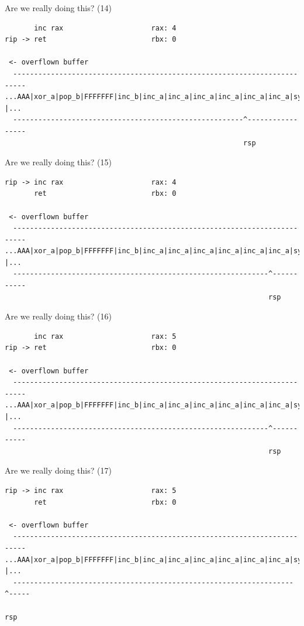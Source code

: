\documentclass[9pt,aspectratio=169]{beamer}
\begin{document}
\begin{frame}[label={sec:org4b069a3},fragile]{Are we really doing this? (14)}
 \begin{verbatim}
       inc rax                     rax: 4
rip -> ret                         rbx: 0

 <- overflown buffer 
  -------------------------------------------------------------------------
...AAA|xor_a|pop_b|FFFFFFF|inc_b|inc_a|inc_a|inc_a|inc_a|inc_a|inc_a|sys |...
  -------------------------------------------------------^-----------------
                                                         rsp
\end{verbatim}
\end{frame}
\begin{frame}[label={sec:org45c3570},fragile]{Are we really doing this? (15)}
 \begin{verbatim}
rip -> inc rax                     rax: 4
       ret                         rbx: 0

 <- overflown buffer 
  -------------------------------------------------------------------------
...AAA|xor_a|pop_b|FFFFFFF|inc_b|inc_a|inc_a|inc_a|inc_a|inc_a|inc_a|sys |...
  -------------------------------------------------------------^-----------
                                                               rsp
\end{verbatim}
\end{frame}
\begin{frame}[label={sec:orgaacbc47},fragile]{Are we really doing this? (16)}
 \begin{verbatim}
       inc rax                     rax: 5
rip -> ret                         rbx: 0

 <- overflown buffer 
  -------------------------------------------------------------------------
...AAA|xor_a|pop_b|FFFFFFF|inc_b|inc_a|inc_a|inc_a|inc_a|inc_a|inc_a|sys |...
  -------------------------------------------------------------^-----------
                                                               rsp
\end{verbatim}
\end{frame}
\begin{frame}[label={sec:org32774f5},fragile]{Are we really doing this? (17)}
 \begin{verbatim}
rip -> inc rax                     rax: 5
       ret                         rbx: 0

 <- overflown buffer 
  -------------------------------------------------------------------------
...AAA|xor_a|pop_b|FFFFFFF|inc_b|inc_a|inc_a|inc_a|inc_a|inc_a|inc_a|sys |...
  -------------------------------------------------------------------^-----
                                                                     rsp
\end{verbatim}
\end{frame}
\end{document}
